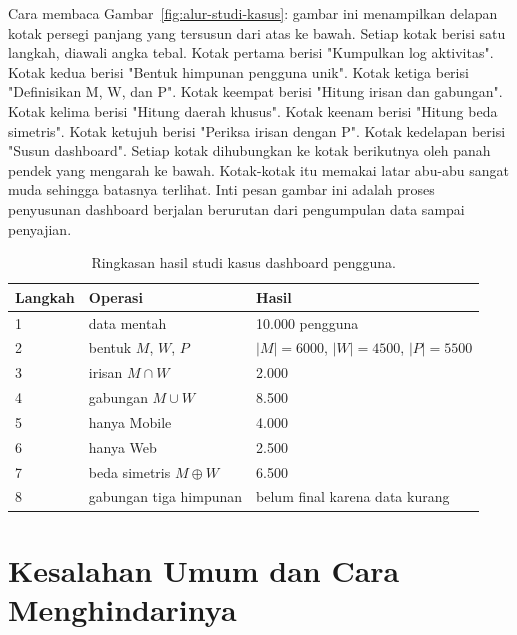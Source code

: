 \documentclass[11pt,a4paper]{article}
\begin{document}
Cara membaca Gambar~\ref{fig:alur-studi-kasus}: gambar ini menampilkan delapan kotak persegi panjang yang tersusun dari atas ke bawah. Setiap kotak berisi satu langkah, diawali angka tebal. Kotak pertama berisi "Kumpulkan log aktivitas". Kotak kedua berisi "Bentuk himpunan pengguna unik". Kotak ketiga berisi "Definisikan M, W, dan P". Kotak keempat berisi "Hitung irisan dan gabungan". Kotak kelima berisi "Hitung daerah khusus". Kotak keenam berisi "Hitung beda simetris". Kotak ketujuh berisi "Periksa irisan dengan P". Kotak kedelapan berisi "Susun dashboard". Setiap kotak dihubungkan ke kotak berikutnya oleh panah pendek yang mengarah ke bawah. Kotak-kotak itu memakai latar abu-abu sangat muda sehingga batasnya terlihat. Inti pesan gambar ini adalah proses penyusunan dashboard berjalan berurutan dari pengumpulan data sampai penyajian.

\begin{table}[H]
	\centering
	\caption{Ringkasan hasil studi kasus dashboard pengguna.}
	\label{tab:studi-kasus}
	\small
	\begin{tabularx}{\textwidth}{l X l}
		\toprule
		Langkah & Operasi                    & Hasil                              \\
		\midrule
		1       & data mentah                & 10.000 pengguna                    \\
		2       & bentuk $M$, $W$, $P$       & $|M|=6000$, $|W|=4500$, $|P|=5500$ \\
		3       & irisan $M \cap W$          & 2.000                              \\
		4       & gabungan $M \cup W$        & 8.500                              \\
		5       & hanya Mobile               & 4.000                              \\
		6       & hanya Web                  & 2.500                              \\
		7       & beda simetris $M \oplus W$ & 6.500                              \\
		8       & gabungan tiga himpunan     & belum final karena data kurang     \\
		\bottomrule
	\end{tabularx}
\end{table}

\section{Kesalahan Umum dan Cara Menghindarinya}
\end{document}
